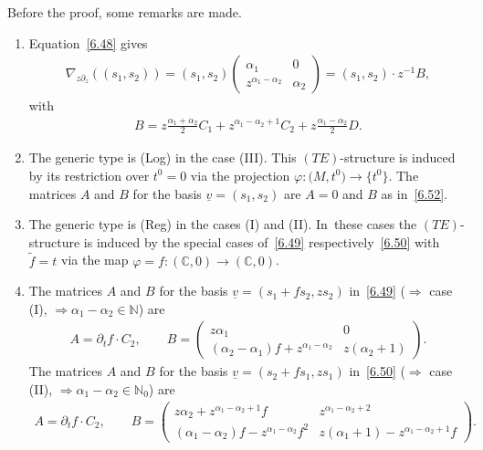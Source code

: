 \documentclass[pdftex]{sigma}%
\numberwithin{equation}{section}
\numberwithin{figure}{section}
\newcommand{\N}{{\mathbb N}}
\newcommand{\C}{{\mathbb C}}
\newcommand{\www}{\widetilde}
\newcommand{\uuuu}{\underline}
\newcommand{\paa}{\partial}
\newcommand{\nnn}{\nabla}
\begin{document}
Before the proof, some remarks are made.


\begin{Remarks}\label{t6.8}\quad
\begin{enumerate}\itemsep=0pt
\item[$(i)$] Equation~\eqref{6.48} gives
\begin{gather}\label{6.52}
\nnn_{z\paa_z}((s_1,s_2))=
(s_1,s_2)\begin{pmatrix}\alpha_1 & 0 \\ z^{\alpha_1-\alpha_2}
& \alpha_2\end{pmatrix}
=(s_1,s_2)\cdot z^{-1}B,
\end{gather}
with
\begin{gather*}
B=z\frac{\alpha_1+\alpha_2}{2}C_1
+z^{\alpha_1-\alpha_2+1}C_2+z\frac{\alpha_1-\alpha_2}{2}D.
\end{gather*}

\item[$(ii)$] The generic type is (Log) in the case (III).
This $(TE)$-structure is induced by its restriction
over $t^0=0$ via the projection $\varphi\colon \big(M,t^0\big)\to\big\{t^0\big\}$.
The matrices $A$ and $B$ for the basis $\uuuu{v}=(s_1,s_2)$
are $A=0$ and $B$ as in~\eqref{6.52}.

\item[$(iii)$] The generic type is (Reg) in the cases
(I) and (II). In~these cases
the $(TE)$-structure is induced by the special
cases of~\eqref{6.49} respectively~\eqref{6.50} with
$\www f=t$ via the map $\varphi=f\colon (\C,0)\to(\C,0)$.

\item[$(iv)$] The matrices $A$ and $B$ for the basis
$\uuuu{v}=(s_1+fs_2,zs_2)$
in~\eqref{6.49} ($\Rightarrow$ case (I),
$\Rightarrow \alpha_1-\alpha_2\in\N$) are
\begin{gather}\label{6.53}
A=\paa_tf\cdot C_2,\qquad
B=\begin{pmatrix}z\alpha_1 & 0 \\ (\alpha_2-\alpha_1)f
+z^{\alpha_1-\alpha_2} & z(\alpha_2+1)\end{pmatrix}\!.
\end{gather}
The matrices $A$ and $B$ for the basis
$\uuuu{v}=(s_2+fs_1,zs_1)$
in~\eqref{6.50} ($\Rightarrow$ case (II),
$\Rightarrow \alpha_1-\alpha_2\allowbreak\in\N_0$) are
\begin{gather}\label{6.54}
A=\paa_tf\cdot C_2,\qquad
B=\begin{pmatrix}z\alpha_2+z^{\alpha_1-\alpha_2+1}f &
z^{\alpha_1-\alpha_2+2} \\ (\alpha_1-\alpha_2)f
-z^{\alpha_1-\alpha_2}f^2 & z(\alpha_1+1)-z^{\alpha_1-\alpha_2+1}f\end{pmatrix}\!.
\end{gather}


\end{enumerate}
\end{Remarks}
\end{document}
